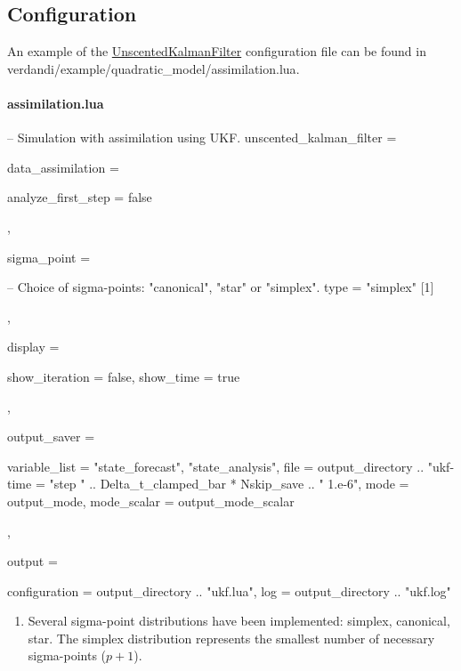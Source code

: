 \documentclass{tufte-book}
\newcounter{points}
\begin{document}
 \hypertarget{ukf_configuration}{}\subsection{\-Configuration}\label{ukf_configuration}

 An example of the {\ttfamily  \hyperlink{class_verdandi_1_1_unscented_kalman_filter}{\-Unscented\-Kalman\-Filter}} configuration file can be found in  {\ttfamily verdandi/example/quadratic\_model/assimilation.lua}.

 \paragraph{assimilation.lua}
 \begin{frame_lua}
-- Simulation with assimilation using UKF.
unscented_kalman_filter = {

   data_assimilation = {

      analyze_first_step = false

   },

   sigma_point = {

      -- Choice of sigma-points: "canonical", "star" or "simplex".
      type = "simplex" [1]

   },

   display = {

      show_iteration = false,
      show_time = true

   },

   output_saver = {

      variable_list = {"state_forecast", "state_analysis"},
      file = output_directory .. "ukf-%
      time = "step " .. Delta_t_clamped_bar * Nskip_save .. " 1.e-6",
      mode = output_mode,
      mode_scalar = output_mode_scalar

   },

   output = {

     configuration = output_directory .. "ukf.lua",
     log = output_directory .. "ukf.log"

  }

}

 \end{frame_lua}

 \begin{enumerate}

\item Several sigma-point distributions have been implemented: simplex, canonical, star. The simplex distribution represents the smallest number of necessary sigma-points ($p + 1$).

 \end{enumerate}
\end{document}
